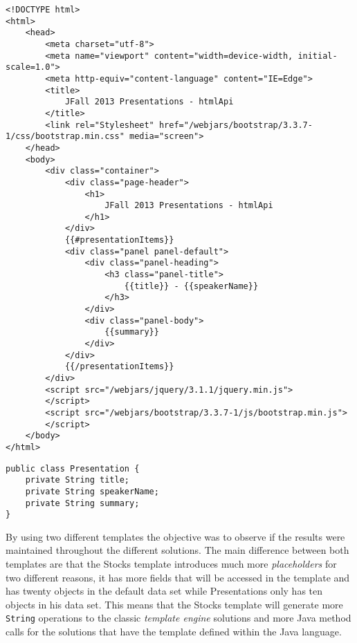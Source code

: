 \bigskip


\begin{lstlisting}[caption={Presentations Template using the Mustache Idiom},captionpos=b,label={lst:mustachepresentationstemplate}]
<!DOCTYPE html>
<html>
	<head>
		<meta charset="utf-8">
		<meta name="viewport" content="width=device-width, initial-scale=1.0">
		<meta http-equiv="content-language" content="IE=Edge">
		<title>
			JFall 2013 Presentations - htmlApi
		</title>
		<link rel="Stylesheet" href="/webjars/bootstrap/3.3.7-1/css/bootstrap.min.css" media="screen">
	</head>
	<body>
		<div class="container">
			<div class="page-header">
				<h1>
					JFall 2013 Presentations - htmlApi
				</h1>
			</div>
			{{#presentationItems}}
			<div class="panel panel-default">
				<div class="panel-heading">
					<h3 class="panel-title">
						{{title}} - {{speakerName}}
					</h3>
				</div>
				<div class="panel-body">
					{{summary}}
				</div>
			</div>
			{{/presentationItems}}
		</div>
		<script src="/webjars/jquery/3.1.1/jquery.min.js">
		</script>
		<script src="/webjars/bootstrap/3.3.7-1/js/bootstrap.min.js">
		</script>
	</body>
</html>
\end{lstlisting}

\bigskip


\begin{minipage}{\linewidth}
\begin{lstlisting}[caption={Presentation Data Type},captionpos=b,label={lst:presentation}]
public class Presentation {
    private String title;
    private String speakerName;
    private String summary;
}
\end{lstlisting}
\end{minipage}

\noindent
By using two different templates the objective was to observe if the results were maintained throughout the different solutions. The main difference between both templates are that the Stocks template introduces much more \textit{placeholders} for two different reasons, it has more fields that will be accessed in the template and has twenty objects in the default data set while Presentations only has ten objects in his data set. This means that the Stocks template will generate more \texttt{String} operations to the classic \textit{template engine} solutions and more Java method calls for the solutions that have the template defined within the Java language.  


